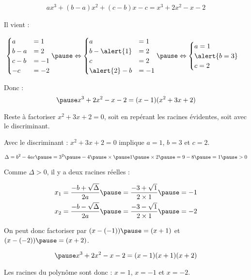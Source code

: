 \documentclass[9pt,professionalfonts,handout,hyperref]{beamer}
\begin{document}
\begin{frame}

\[\begin{aligned}
ax^3+(b-a)x^2+(c-b)x -c = x^3+2x^2-x-2
\end{aligned}\]

\bigskip 

Il vient : 
	
\[\begin{aligned}
\begin{cases}
	a   & = 1 \\
	b-a & = 2 \\
	c-b & =-1 \\
	-c  & =-2
\end{cases}
\pause \Leftrightarrow
\begin{cases}
	a           & = 1 \\
	b-\alert{1} & = 2 \\
	c           & =2  \\
	\alert{2}-b & =-1
\end{cases}
\pause \Leftrightarrow
\begin{cases}
	a= 1         \\
	\alert{b= 3} \\
	c =2
\end{cases}
\end{aligned}\]

\bigskip 
\pause Donc :
\[\begin{aligned}
\pause x^3+2x^2-x-2 = (x-1)(x^2+3x+2) 
\end{aligned}\]

\bigskip 

\pause Reste à factoriser $x^2+3x+2 = 0$, soit en repérant les racines évidentes, soit avec le discriminant. 
\end{frame}

\begin{frame}

Avec le discriminant : $x^2+3x+2 = 0$ implique \pause $a=1$, \pause $b=3$ et \pause $c=2$.

\[
\Delta = b^2 -4ac \pause = 3^2 \pause - 4 \pause \times \pause 1 \pause \times 2 \pause = 9-8 \pause = 1 \pause >0
\]


\pause Comme $\Delta>0$, il y a deux racines réelles : 

\[\begin{aligned}
&x_1 = \frac{-b + \sqrt{\Delta}}{2a} \pause = \frac{-3 + \sqrt{1}}{2\times1} \pause = -1\\
&x_2 = \frac{-b - \sqrt{\Delta}}{2a} \pause = \frac{-3 - \sqrt{1}}{2\times1} \pause = -2\\
\end{aligned}\]

\pause On peut donc factoriser par \pause $(x-(-1)) \pause = (x+1)$ \pause et $(x-(-2)) \pause = (x+2)$.

\[\begin{aligned}
\pause x^3+2x^2-x-2 = (x-1)(x+1)(x+2)  
\end{aligned}\]

\bigskip 
\pause Les racines du polynôme sont donc : $x=1$, $x=-1$ et $x=-2$.

\end{frame}
\end{document}

